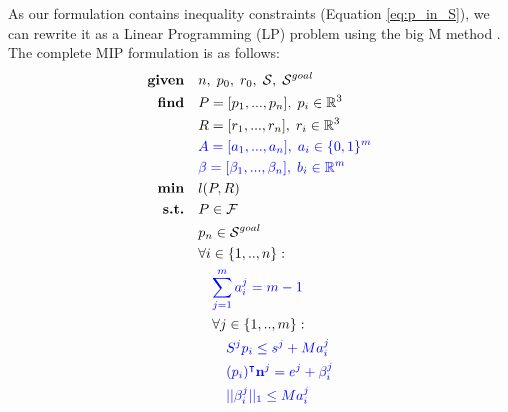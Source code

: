 As our formulation contains inequality constraints (Equation \ref{eq:p_in_S}), we can rewrite it as a Linear Programming (LP) problem using the big M method \cite{big_M}. The complete MIP formulation is as follows:
\begin{align}
    \textrm{\textbf{given}} %
                            \quad & n, \; p_0, \; r_0, \; \mathcal{S}, \; \mathcal{S}^{goal} \nonumber\\
    \textrm{\textbf{find}}  \quad & P=[p_1,...,p_n], \; p_i \in \mathbb{R}^{3} \nonumber\\
                            \quad & R=[r_1,...,r_n], \; r_i \in \mathbb{R}^{3} \nonumber\\
                            \quad & \textcolor{blue}{A=[a_1,...,a_n], \; a_i \in \{0,1\}^{m}} \label{eq:cbm:mip_complete:slacks}\\
                            \quad & \textcolor{blue}{\beta=[\beta_1,...,\beta_n], \; b_i \in \mathbb{R}^{m}} \nonumber\\
    \textrm{\textbf{min}}  \quad & l(P,R) \nonumber\\
    \textrm{\textbf{s.t.}}  \quad & P \in \mathcal{F} \nonumber\\
                            \quad & p_n \in \mathcal{S}^{goal} \nonumber\\
                            \quad & \forall i \in \{1,..,n\} : \nonumber\\
                                \quad & \quad \textcolor{blue}{\sum_{j=1}^{m} a_i^j = m-1} \label{eq:cbm:mip_complete:card}\\
                                \quad & \quad \forall j \in \{1,..,m\} : \nonumber\\
                                    \quad & \quad \quad \textcolor{blue}{S^j p_i \leq s^j + M a_i^j } \label{eq:cbm:mip_complete:surf}\\
                                    \quad & \quad \quad \textcolor{blue}{(p_i)^{\intercal} \textbf{n}^j = e^j + \beta_i^j} \nonumber\\
                                    \quad & \quad \quad \textcolor{blue}{||\beta_i^j||_1 \leq M a_i^j} \nonumber\\
                                    \nonumber
\end{align}
